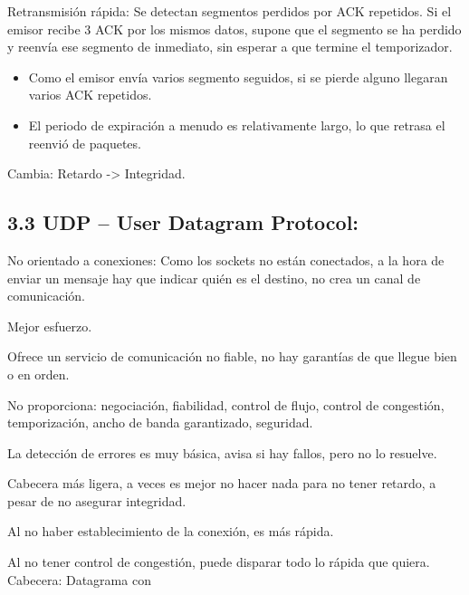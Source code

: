 \documentclass[12pt, twoside, openright]{report} %
\begin{document}
Retransmisión rápida: Se detectan segmentos perdidos por ACK
repetidos. Si el emisor recibe 3 ACK por los mismos datos, supone
que el segmento se ha perdido y reenvía ese segmento de inmediato,
sin esperar a que termine el temporizador.

\begin{itemize}
	\item Como el emisor envía varios segmento seguidos, si se pierde alguno
	      llegaran varios ACK repetidos.
	\item El periodo de expiración a menudo es relativamente largo, lo que
	      retrasa el reenvió de paquetes.
\end{itemize}

Cambia: Retardo -\textgreater{} Integridad.

\subsection{3.3 UDP -- User Datagram Protocol:}


No orientado a conexiones: Como los sockets no están conectados, a
la hora de enviar un mensaje hay que indicar quién es el destino, no
crea un canal de comunicación.

Mejor esfuerzo.

Ofrece un servicio de comunicación no fiable, no hay garantías de
que llegue bien o en orden.

No proporciona: negociación, fiabilidad, control de flujo, control
de congestión, temporización, ancho de banda garantizado, seguridad.

La detección de errores es muy básica, avisa si hay fallos, pero no
lo resuelve.

Cabecera más ligera, a veces es mejor no hacer nada para no tener
retardo, a pesar de no asegurar integridad.

Al no haber establecimiento de la conexión, es más rápida.

Al no tener control de congestión, puede disparar todo lo rápida que
quiera.
\pagebreak
Cabecera: Datagrama con
\end{document}
